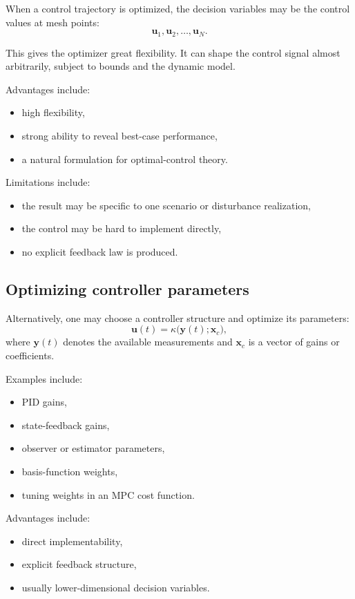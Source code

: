 \documentclass[11pt]{article}
\newcommand{\vect}[1]{\boldsymbol{#1}}
\newcommand{\xc}{\vect{x}_c}
\newcommand{\uvec}{\vect{u}}
\newcommand{\yvec}{\vect{y}}
\begin{document}
When a control trajectory is optimized, the decision variables may be the control values at mesh points:
\begin{equation}
\uvec_1,\uvec_2,\ldots,\uvec_N.
\end{equation}

This gives the optimizer great flexibility. It can shape the control signal almost arbitrarily, subject to bounds and the dynamic model.

Advantages include:
\begin{itemize}[leftmargin=1.4em]
  \item high flexibility,
  \item strong ability to reveal best-case performance,
  \item a natural formulation for optimal-control theory.
\end{itemize}

Limitations include:
\begin{itemize}[leftmargin=1.4em]
  \item the result may be specific to one scenario or disturbance realization,
  \item the control may be hard to implement directly,
  \item no explicit feedback law is produced.
\end{itemize}

\subsection{Optimizing controller parameters}

Alternatively, one may choose a controller structure and optimize its parameters:
\begin{equation}
\uvec(t)=\kappa\big(\yvec(t);\xc\big),
\end{equation}
where $\yvec(t)$ denotes the available measurements and $\xc$ is a vector of gains or coefficients.

Examples include:
\begin{itemize}[leftmargin=1.4em]
  \item PID gains,
  \item state-feedback gains,
  \item observer or estimator parameters,
  \item basis-function weights,
  \item tuning weights in an MPC cost function.
\end{itemize}

Advantages include:
\begin{itemize}[leftmargin=1.4em]
  \item direct implementability,
  \item explicit feedback structure,
  \item usually lower-dimensional decision variables.
\end{itemize}
\end{document}
